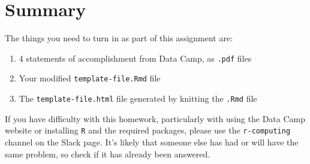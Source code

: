 \documentclass[paper=letter, fontsize=11pt]{scrartcl}
\numberwithin{equation}{section}
\numberwithin{figure}{section}
\numberwithin{table}{section}
\begin{document}
\section*{Summary}

The things you need to turn in as part of this assignment are:
\begin{enumerate}
  \item 4 statements of accomplishment from Data Camp, as \texttt{.pdf} files
  \item Your modified \texttt{template-file.Rmd} file
  \item The \texttt{template-file.html} file generated by knitting the \texttt{.Rmd} file
\end{enumerate}
If you have difficulty with this homework, particularly with using the Data Camp website or installing \texttt{R} and the required packages, please use the \texttt{r-computing} channel on the Slack page.
It's likely that someone else has had or will have the same problem, so check if it has already been answered.




\end{document}
